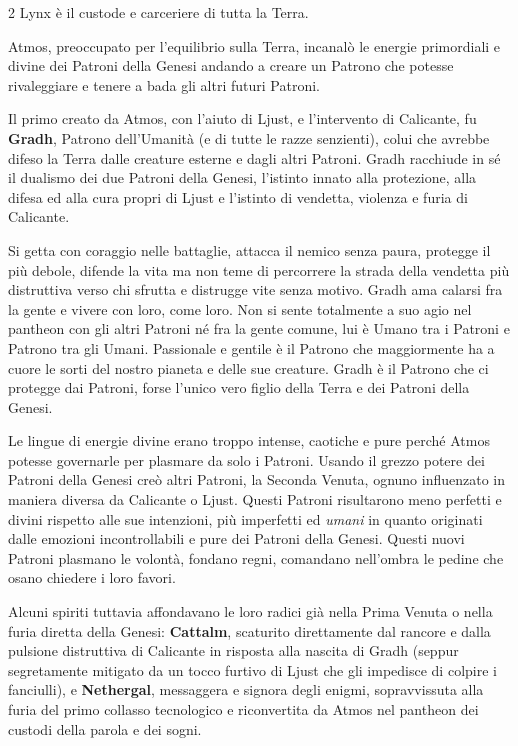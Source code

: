 \begin{multicols}{2}
Lynx è il custode e carceriere di tutta la Terra.

Atmos, preoccupato per l'equilibrio sulla Terra, incanalò le energie primordiali e divine dei Patroni della Genesi andando a creare un Patrono che potesse rivaleggiare e tenere a bada gli altri futuri Patroni.

Il primo creato da Atmos, con l'aiuto di Ljust, e l'intervento di Calicante, fu \textbf{Gradh}, Patrono dell'Umanità (e di tutte le razze senzienti), colui che avrebbe difeso la Terra dalle creature esterne e dagli altri Patroni. Gradh racchiude in sé il dualismo dei due Patroni della Genesi, l'istinto innato alla protezione, alla difesa ed alla cura propri di Ljust e l'istinto di vendetta, violenza e furia di Calicante.

Si getta con coraggio nelle battaglie, attacca il nemico senza paura, protegge il più debole, difende la vita ma non teme di percorrere la strada della vendetta più distruttiva verso chi sfrutta e distrugge vite senza motivo. Gradh ama calarsi fra la gente e vivere con loro, come loro. Non si sente totalmente a suo agio nel pantheon con gli altri Patroni né fra la gente comune, lui è Umano tra i Patroni e Patrono tra gli Umani. Passionale e gentile è il Patrono che maggiormente ha a cuore le sorti del nostro pianeta e delle sue creature. Gradh è il Patrono che ci protegge dai Patroni, forse l'unico vero figlio della Terra e dei Patroni della Genesi.

Le lingue di energie divine erano troppo intense, caotiche e pure perché Atmos potesse governarle per plasmare da solo i Patroni. Usando il grezzo potere dei Patroni della Genesi creò altri Patroni, la Seconda Venuta, ognuno influenzato in maniera diversa da Calicante o Ljust. Questi Patroni risultarono meno perfetti e divini rispetto alle sue intenzioni, più imperfetti ed \emph{umani} in quanto originati dalle emozioni incontrollabili e pure dei Patroni della Genesi. Questi nuovi Patroni plasmano le volontà, fondano regni, comandano nell'ombra le pedine che osano chiedere i loro favori.

Alcuni spiriti tuttavia affondavano le loro radici già nella Prima Venuta o nella furia diretta della Genesi: \textbf{Cattalm}, scaturito direttamente dal rancore e dalla pulsione distruttiva di Calicante in risposta alla nascita di Gradh (seppur segretamente mitigato da un tocco furtivo di Ljust che gli impedisce di colpire i fanciulli), e \textbf{Nethergal}, messaggera e signora degli enigmi, sopravvissuta alla furia del primo collasso tecnologico e riconvertita da Atmos nel pantheon dei custodi della parola e dei sogni.


\end{multicols}
